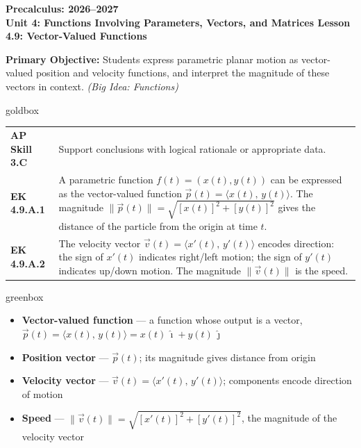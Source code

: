 \documentclass[10pt]{article}
\newcommand{\CourseName}{Precalculus}
\newcommand{\SchoolYear}{2026--2027}
\newcommand{\UnitNumberName}{Unit 4: Functions Involving Parameters, Vectors, and Matrices \quad}
\newcommand{\LessonNumberName}{Lesson 4.9: Vector-Valued Functions}
\begin{document}
\begin{center}
    {\Large\bfseries \CourseName: \SchoolYear \\
    {\small\bfseries \UnitNumberName \LessonNumberName}}
\end{center}

\begin{tcolorbox}[colback=sky, colframe=navy, boxrule=0.9pt, arc=2mm,
    left=2mm, right=2mm, top=1.5mm, bottom=1.5mm]
    \textbf{Primary Objective:} Students express parametric planar motion as
    vector-valued position and velocity functions, and interpret the magnitude
    of these vectors in context.
    \hfill \textit{(Big Idea: Functions)}
\end{tcolorbox}

\renewcommand{\arraystretch}{1.6}
\begin{skillbox}{goldbox}
\begin{tabularx}{\linewidth}{@{}p{2.6cm}X@{}}
\textbf{AP Skill 3.C} & Support conclusions with logical rationale or appropriate data.\\
\textbf{EK 4.9.A.1}  & A parametric function $f(t)=(x(t),y(t))$ can be expressed as the
  vector-valued function $\vec{p}(t)=\langle x(t),\,y(t)\rangle$. The magnitude
  $\|\vec{p}(t)\|=\sqrt{[x(t)]^2+[y(t)]^2}$ gives the distance of the particle from
  the origin at time $t$.\\
\textbf{EK 4.9.A.2}  & The velocity vector $\vec{v}(t)=\langle x'(t),\,y'(t)\rangle$
  encodes direction: the sign of $x'(t)$ indicates right/left motion; the sign of
  $y'(t)$ indicates up/down motion. The magnitude $\|\vec{v}(t)\|$ is the speed.
\end{tabularx}
\end{skillbox}

\begin{skillbox}{greenbox}
\begin{itemize}
  \item \textbf{Vector-valued function} --- a function whose output is a vector,
        $\vec{p}(t)=\langle x(t),\,y(t)\rangle=x(t)\,\hat{\imath}+y(t)\,\hat{\jmath}$
  \item \textbf{Position vector} --- $\vec{p}(t)$; its magnitude gives distance from origin
  \item \textbf{Velocity vector} --- $\vec{v}(t)=\langle x'(t),\,y'(t)\rangle$;
        components encode direction of motion
  \item \textbf{Speed} --- $\|\vec{v}(t)\|=\sqrt{[x'(t)]^2+[y'(t)]^2}$, the
        magnitude of the velocity vector
\end{itemize}
\end{skillbox}
\end{document}
